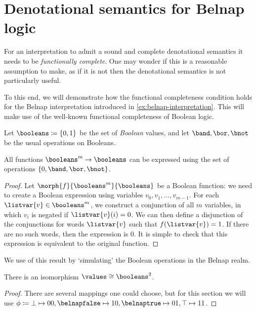 \section{Denotational semantics for Belnap logic}\label{sec:denotational-belnap}

For an interpretation to admit a sound and complete denotational semantics it
needs to be \emph{functionally complete}.
One may wonder if this is a reasonable assumption to make, as if it is not then
the denotational semantics is not particularly useful.

To this end, we will demonstrate how the functional completeness condition holds
for the Belnap interpretation introduced in \cref{ex:belnap-interpretation}.
This will make use of the well-known functional completeness of Boolean logic.

\begin{definition}
    Let \(\booleans \coloneqq \{0, 1\}\) be the set of \emph{Boolean} values,
    and let \(\band,\bor,\bnot\) be the usual operations on Booleans.
\end{definition}

\begin{lemma}\label{lem:boolean-complete}
    All functions \(\booleans^{m} \to \booleans\) can be expressed using
    the set of operations \(\{0, \band,\bor,\bnot\}\).
\end{lemma}
\begin{proof}
    Let \(\morph{f}{\booleans^{m}}{\booleans}\) be a Boolean function: we need
    to create a Boolean expression using variables \(v_0, v_1, \dots, v_{m-1}\).
    For each \(\listvar{v} \in \booleans^m\), we construct a conjunction of
    all \(m\) variables, in which \(v_i\) is negated if \(\listvar{v}(i) = 0\).
    We can then define a disjunction of the conjunctions for words
    \(\listvar{v}\) such that \(f(\listvar{v}) = 1\).
    If there are no such words, then the expression is \(0\).
    It is simple to check that this expression is equivalent to the original
    function.
\end{proof}

We use of this result by `simulating' the Boolean operations in the
Belnap realm.

\begin{lemma}
    There is an isomorphism \(\values \cong \booleans^2\).
\end{lemma}
\begin{proof}
    There are several mappings one could choose, but for this
    section we will use \(\phi \coloneqq
    \bot \mapsto 00, \belnapfalse \mapsto 10,
    \belnaptrue \mapsto 01, \top \mapsto 11
    \).
\end{proof}

